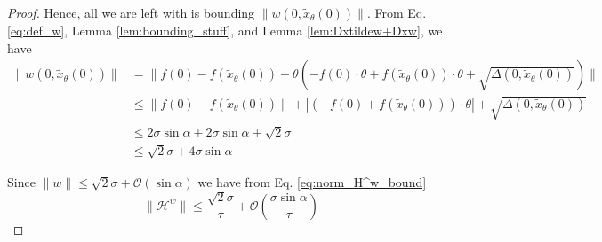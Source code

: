 \documentclass[12pt]{article}
\theoremstyle{remark}
\newcommand{\OO}{\mathcal{O}}
\newcommand{\HH}{\mathcal{H}}
\newcommand{\wtilde}[1]{\widetilde{#1}}
\begin{document}
\begin{appendices}
\begin{proof}
Hence, all we are left with is bounding  $\|w(0,\wtilde x_\theta (0))\|$. 
From Eq. \eqref{eq:def_w}, Lemma \ref{lem:bounding_stuff}, and Lemma \ref{lem:Dxtildew+Dxw}, we have 
\begin{align*}
    \|w(0,\wtilde x_\theta(0))\| &=\|f(0) - f(\wtilde{x}_\theta(0)) + \theta \left(- f(0)\cdot \theta + f(\wtilde{x}_\theta(0)) \cdot \theta + 
    \sqrt{\Delta(0,\wtilde x_\theta (0))}\right)\|
    \\
    &\leq \|f(0) - f(\wtilde{x}_\theta(0))\| + \left|(- f(0) + f(\wtilde{x}_\theta(0))) \cdot \theta\right| + 
    \sqrt{\Delta(0,\wtilde x_\theta (0))}
    \\
    &\leq 2\sigma \sin \alpha + 2\sigma \sin \alpha + \sqrt{2}\sigma 
    \\
    &\leq \sqrt{2}\sigma  + 4\sigma \sin \alpha 
\end{align*}

Since $\|w\| \leq \sqrt{2}\sigma + \OO(\sin \alpha)$ 
we have from Eq. \eqref{eq:norm_H^w_bound}
\[
\|\HH^w\| \leq \frac{\sqrt{2}\sigma}{\tau} + \OO(\frac{\sigma\sin \alpha}{\tau})
\]
\end{proof}



\end{appendices}
\end{document}
